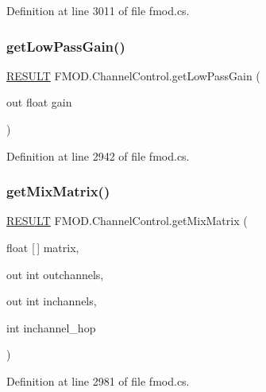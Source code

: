 Definition at line 3011 of file fmod.\+cs.

\mbox{\label{class_f_m_o_d_1_1_channel_control_a83e04fc1b934bbcf8e1a458b41aa9429}} 
\subsubsection{\texorpdfstring{get\+Low\+Pass\+Gain()}{getLowPassGain()}}
{\footnotesize\ttfamily \hyperlink{namespace_f_m_o_d_a305d1176ef3f8c8815861a60407ac33d}{R\+E\+S\+U\+LT} F\+M\+O\+D.\+Channel\+Control.\+get\+Low\+Pass\+Gain (\begin{DoxyParamCaption}\item[{out float}]{gain }\end{DoxyParamCaption})}



Definition at line 2942 of file fmod.\+cs.

\mbox{\label{class_f_m_o_d_1_1_channel_control_aedc914ffd91040a2e7044eeacef0bda0}} 
\subsubsection{\texorpdfstring{get\+Mix\+Matrix()}{getMixMatrix()}}
{\footnotesize\ttfamily \hyperlink{namespace_f_m_o_d_a305d1176ef3f8c8815861a60407ac33d}{R\+E\+S\+U\+LT} F\+M\+O\+D.\+Channel\+Control.\+get\+Mix\+Matrix (\begin{DoxyParamCaption}\item[{float \mbox{[}$\,$\mbox{]}}]{matrix,  }\item[{out int}]{outchannels,  }\item[{out int}]{inchannels,  }\item[{int}]{inchannel\+\_\+hop }\end{DoxyParamCaption})}



Definition at line 2981 of file fmod.\+cs.

